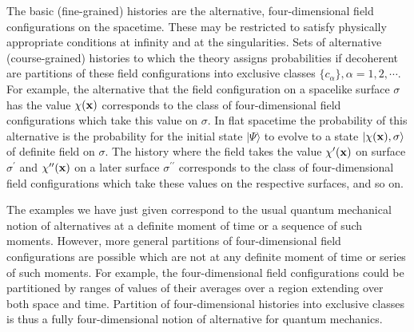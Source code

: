 The basic (fine-grained) histories are the alternative, four-dimensional
field configurations on the spacetime. These may be restricted to
satisfy physically appropriate conditions at infinity and at the
singularities.
Sets of alternative (course-grained) histories to which the theory
assigns probabilities if decoherent are partitions of these field
configurations into exclusive classes $\{c_\alpha\}, \alpha=1,2,\cdots$.
For example, the alternative that the field configuration on a spacelike
surface $\sigma$ has the value $\chi({\bf x})$ corresponds to the class
of four-dimensional field configurations which take this value on
$\sigma$. In flat spacetime the probability of this alternative is the
probability for the initial state $|\Psi\rangle$ to
evolve to a state $|\chi ({\bf x}), \sigma\rangle$ of definite field on
$\sigma$. The history where the field takes the value $\chi^\prime({\bf
x})$ on surface $\sigma^\prime$ and $\chi^{\prime\prime}({\bf x})$ on a later
surface $\sigma^{\prime\prime}$ corresponds to the class of
four-dimensional field configurations which take these values on
the respective surfaces, and so on.

The examples we have just given correspond to the usual quantum
mechanical notion of alternatives at a definite moment of time or a
sequence of such moments. However,
more general partitions of four-dimensional field configurations are
possible which are not at any definite moment of time or series of such
moments.  For example, the four-dimensional field configurations could
be partitioned by ranges of values of their averages over a region
extending over both space and time.  Partition of four-dimensional histories
into exclusive classes is thus a fully four-dimensional notion of alternative
for quantum mechanics.

